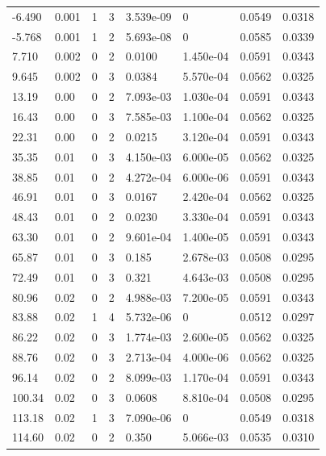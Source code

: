 \documentclass[preview]{standalone}
\begin{document}
{{\begin{tabular}{L{1.2cm}C{1.2cm} C{0.3cm}C{0.5cm} C{1.4cm}C{1.4cm} C{1.4cm}C{1.4cm}}
  -6.490  &  0.001  & 1     &  3 &  3.539e-09  & 0  & 0.0549 &  0.0318   \\ 
  -5.768  &  0.001  & 1     &  2 &  5.693e-08  & 0  & 0.0585 &  0.0339   \\ 
  7.710  &  0.002  & 0     &  2 &  0.0100  & 1.450e-04  & 0.0591 &  0.0343   \\ 
  9.645  &  0.002  & 0     &  3 &  0.0384  & 5.570e-04  & 0.0562 &  0.0325   \\ 
  13.19  &  0.00  & 0     &  2 &  7.093e-03  & 1.030e-04  & 0.0591 &  0.0343   \\ 
  16.43  &  0.00  & 0     &  3 &  7.585e-03  & 1.100e-04  & 0.0562 &  0.0325   \\ 
  22.31  &  0.00  & 0     &  2 &  0.0215  & 3.120e-04  & 0.0591 &  0.0343   \\ 
  35.35  &  0.01  & 0     &  3 &  4.150e-03  & 6.000e-05  & 0.0562 &  0.0325   \\ 
  38.85  &  0.01  & 0     &  2 &  4.272e-04  & 6.000e-06  & 0.0591 &  0.0343   \\ 
  46.91  &  0.01  & 0     &  3 &  0.0167  & 2.420e-04  & 0.0562 &  0.0325   \\ 
  48.43  &  0.01  & 0     &  2 &  0.0230  & 3.330e-04  & 0.0591 &  0.0343   \\ 
  63.30  &  0.01  & 0     &  2 &  9.601e-04  & 1.400e-05  & 0.0591 &  0.0343   \\ 
  65.87  &  0.01  & 0     &  3 &  0.185  & 2.678e-03  & 0.0508 &  0.0295   \\ 
  72.49  &  0.01  & 0     &  3 &  0.321  & 4.643e-03  & 0.0508 &  0.0295   \\ 
  80.96  &  0.02  & 0     &  2 &  4.988e-03  & 7.200e-05  & 0.0591 &  0.0343   \\ 
  83.88  &  0.02  & 1     &  4 &  5.732e-06  & 0  & 0.0512 &  0.0297   \\ 
  86.22  &  0.02  & 0     &  3 &  1.774e-03  & 2.600e-05  & 0.0562 &  0.0325   \\ 
  88.76  &  0.02  & 0     &  3 &  2.713e-04  & 4.000e-06  & 0.0562 &  0.0325   \\ 
  96.14  &  0.02  & 0     &  2 &  8.099e-03  & 1.170e-04  & 0.0591 &  0.0343   \\ 
  100.34  &  0.02  & 0     &  3 &  0.0608  & 8.810e-04  & 0.0508 &  0.0295   \\ 
  113.18  &  0.02  & 1     &  3 &  7.090e-06  & 0  & 0.0549 &  0.0318   \\ 
  114.60  &  0.02  & 0     &  2 &  0.350  & 5.066e-03  & 0.0535 &  0.0310   \\ 

\end{tabular}}}
\end{document}
